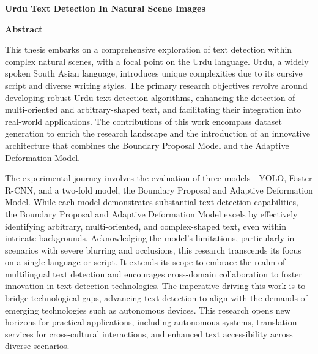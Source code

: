 \documentclass{article}
\begin{document}
\pagestyle{empty}
\thispagestyle{empty}

\begin{center}
    {\LARGE \bf \noindent Urdu Text Detection In Natural Scene Images}
\end{center}

\vspace{0.2in}
{\bf \noindent Abstract}\\
\vspace{-0.1in}

\noindent  This thesis embarks on a comprehensive exploration of text detection within complex natural scenes, with a focal point on the Urdu language. Urdu, a widely spoken South Asian language, introduces unique complexities due to its cursive script and diverse writing styles. The primary research objectives revolve around developing robust Urdu text detection algorithms, enhancing the detection of multi-oriented and arbitrary-shaped text, and facilitating their integration into real-world applications. The contributions of this work encompass dataset generation to enrich the research landscape and the introduction of an innovative architecture that combines the Boundary Proposal Model and the Adaptive Deformation Model.

The experimental journey involves the evaluation of three models - YOLO, Faster R-CNN, and a two-fold model, the Boundary Proposal and Adaptive Deformation Model. While each model demonstrates substantial text detection capabilities, the Boundary Proposal and Adaptive Deformation Model excels by effectively identifying arbitrary, multi-oriented, and complex-shaped text, even within intricate backgrounds. Acknowledging the model's limitations, particularly in scenarios with severe blurring and occlusions, this research transcends its focus on a single language or script. It extends its scope to embrace the realm of multilingual text detection and encourages cross-domain collaboration to foster innovation in text detection technologies. The imperative driving this work is to bridge technological gaps, advancing text detection to align with the demands of emerging technologies such as autonomous devices. This research opens new horizons for practical applications, including autonomous systems, translation services for cross-cultural interactions, and enhanced text accessibility across diverse scenarios.
\end{document}
